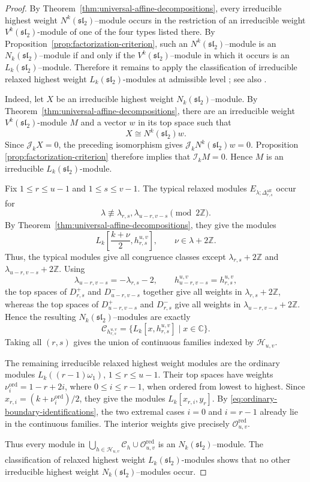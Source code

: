 \documentclass[11 pt]{amsart}
\theoremstyle{definition}
\theoremstyle{plain}
\begin{document}
\begin{proof}
By Theorem~\ref{thm:universal-affine-decompositions}, every irreducible
highest weight $N^k(\mathfrak{sl}_2)$--module occurs in the restriction of
an irreducible weight $V^k(\mathfrak{sl}_2)$-module of one of the four types
listed there. By Proposition~\ref{prop:factorization-criterion}, such an
$N^k(\mathfrak{sl}_2)$--module is an
$N_k(\mathfrak{sl}_2)$--module if and only if
the  $V^k(\mathfrak{sl}_2)$--module in which it occurs is an
$L_k(\mathfrak{sl}_2)$--module.
Therefore it remains to apply the classification of irreducible relaxed
highest weight $L_k(\mathfrak{sl}_2)$-modules at admissible level
\cite[Theorem~4.0.11]{AM95}; see also \cite[Theorem~2.3]{ACR}.


Indeed, let $X$ be an irreducible highest weight
$N_k(\mathfrak{sl}_2)$--module. By
Theorem~\ref{thm:universal-affine-decompositions}, there are an
irreducible weight $V^k(\mathfrak{sl}_2)$-module $M$ and a vector $w$
in its top space such that
\[
X\cong N^k(\mathfrak{sl}_2)w.
\]
Since $\mathcal J_kX=0$, the preceding isomorphism gives
$\mathcal J_kN^k(\mathfrak{sl}_2)w=0$. Proposition~
\ref{prop:factorization-criterion} therefore implies that
$\mathcal I_kM=0$. Hence $M$ is an irreducible
$L_k(\mathfrak{sl}_2)$-module.

Fix $1\le r\le u-1$ and $1\le s\le v-1$. The typical relaxed modules
$E_{\lambda;\Delta^{\mathrm{aff}}_{r,s}}$ occur for
\[
  \lambda\not\equiv\lambda_{r,s},\lambda_{u-r,v-s}
  \pmod{2\mathbb Z}.
\]
By Theorem~\ref{thm:universal-affine-decompositions}, they give the
modules
\[
L_k\left[\frac{k+\nu}{2},h^{u,v}_{r,s}\right],
\qquad \nu\in\lambda+2\mathbb Z.
\]
Thus, the typical modules give all congruence classes except
$\lambda_{r,s}+2\mathbb Z$ and
$\lambda_{u-r,v-s}+2\mathbb Z$. Using
\[
\lambda_{u-r,v-s}=-\lambda_{r,s}-2,
\qquad
h^{u,v}_{u-r,v-s}=h^{u,v}_{r,s},
\]
the top spaces of $D^+_{r,s}$ and $D^-_{u-r,v-s}$ together give all
weights in $\lambda_{r,s}+2\mathbb Z$, whereas the top spaces of
$D^+_{u-r,v-s}$ and $D^-_{r,s}$ give all weights in
$\lambda_{u-r,v-s}+2\mathbb Z$. Hence the resulting
$N_k(\mathfrak{sl}_2)$--modules are exactly
\[
\mathcal C_{h^{u,v}_{r,s}}
=\{L_k[x,h^{u,v}_{r,s}]\mid x\in\mathbb C\}.
\]
Taking all $(r,s)$ gives the union of continuous families indexed by
$\mathcal H_{u,v}$.

The remaining irreducible relaxed highest weight modules are the ordinary
modules $L_k((r-1)\omega_1)$, $1\le r\le u-1$. Their top spaces have
weights $\nu_i^{\mathrm{ord}}=1-r+2i$, where $0\le i\le r-1$,
when ordered from lowest to highest. Since
$x_{r,i}=(k+\nu_i^{\mathrm{ord}})/2$, they give the modules
$L_k[x_{r,i},y_r]$. By
\eqref{eq:ordinary-boundary-identifications}, the two extremal cases
$i=0$ and $i=r-1$ already lie in the continuous families. The interior
weights give precisely $\mathcal O^{\mathrm{red}}_{u,v}$.

Thus every module in
$\bigcup_{h\in\mathcal H_{u,v}}\mathcal C_h
\cup\mathcal O^{\mathrm{red}}_{u,v}$
is an $N_k(\mathfrak{sl}_2)$--module. The classification of relaxed
highest weight $L_k(\mathfrak{sl}_2)$-modules shows that no other
irreducible highest weight $N_k(\mathfrak{sl}_2)$--modules occur.
\end{proof}
\end{document}
